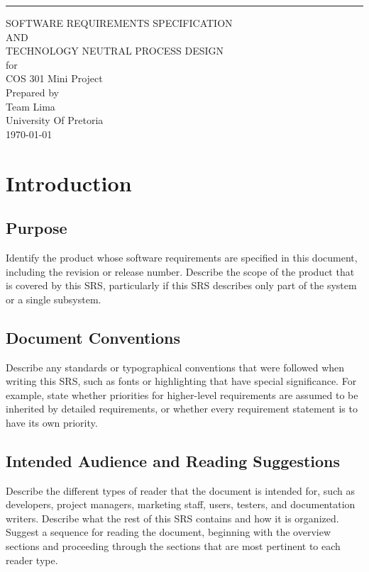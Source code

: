 \documentclass{scrreprt}
\date{}
\begin{document}
\begin{flushright}
    \rule{16cm}{5pt}\vskip1cm
    \begin{bfseries}
        \Huge{SOFTWARE REQUIREMENTS SPECIFICATION \\ AND \\ TECHNOLOGY NEUTRAL PROCESS DESIGN}\\
        \vspace{1cm}
        for\\
        \vspace{1cm}
        COS 301 Mini Project\\
        \vspace{1cm}
        Prepared by \\ Team Lima\\
        \vspace{1cm}
        University Of Pretoria\\
        \vspace{1cm}
        \today\\
    \end{bfseries}
\end{flushright}

\tableofcontents


\chapter{Introduction}

\section{Purpose}
Identify the product whose software requirements are specified in this 
document, including the revision or release number. Describe the scope of the 
product that is covered by this SRS, particularly if this SRS describes only 
part of the system or a single subsystem.

\section{Document Conventions}
Describe any standards or typographical conventions that were followed when 
writing this SRS, such as fonts or highlighting that have special significance.  
For example, state whether priorities  for higher-level requirements are assumed 
to be inherited by detailed requirements, or whether every requirement statement 
is to have its own priority.

\section{Intended Audience and Reading Suggestions}
Describe the different types of reader that the document is intended for, 
such as developers, project managers, marketing staff, users, testers, and 
documentation writers. Describe what the rest of this SRS contains and how it is 
organized. Suggest a sequence for reading the document, beginning with the 
overview sections and proceeding through the sections that are most pertinent to 
each reader type.
\end{document}
